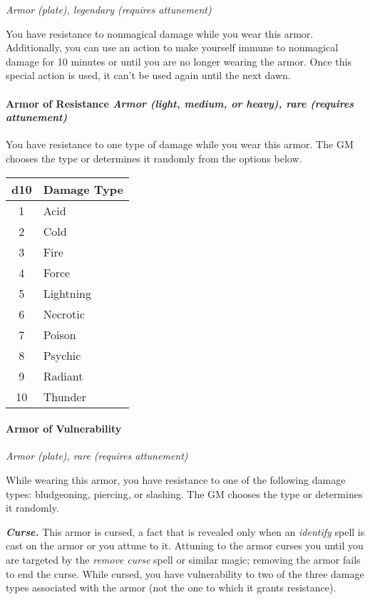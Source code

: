 \documentclass[
]{article}
\begin{document}
\emph{Armor (plate), legendary (requires attunement)}

You have resistance to nonmagical damage while you wear this armor.
Additionally, you can use an action to make yourself immune to
nonmagical damage for 10 minutes or until you are no longer wearing the
armor. Once this special action is used, it can't be used again until
the next dawn.

\hypertarget{armor-of-resistance-armor-light-medium-or-heavy-rare-requires-attunement}{%
\paragraph{\texorpdfstring{Armor of Resistance \emph{Armor (light,
medium, or heavy), rare (requires
attunement)}}{Armor of Resistance Armor (light, medium, or heavy), rare (requires attunement)}}\label{armor-of-resistance-armor-light-medium-or-heavy-rare-requires-attunement}}

You have resistance to one type of damage while you wear this armor. The
GM chooses the type or determines it randomly from the options below.

\begin{longtable}[]{@{}cl@{}}
\toprule
d10 & Damage Type\tabularnewline
\midrule
\endhead
1 & Acid\tabularnewline
2 & Cold\tabularnewline
3 & Fire\tabularnewline
4 & Force\tabularnewline
5 & Lightning\tabularnewline
6 & Necrotic\tabularnewline
7 & Poison\tabularnewline
8 & Psychic\tabularnewline
9 & Radiant\tabularnewline
10 & Thunder\tabularnewline
\bottomrule
\end{longtable}

\hypertarget{armor-of-vulnerability}{%
\paragraph{Armor of Vulnerability}\label{armor-of-vulnerability}}

\emph{Armor (plate), rare (requires attunement)}

While wearing this armor, you have resistance to one of the following
damage types: bludgeoning, piercing, or slashing. The GM chooses the
type or determines it randomly.

\emph{\textbf{Curse.}} This armor is cursed, a fact that is revealed
only when an \emph{identify} spell is cast on the armor or you attune to
it. Attuning to the armor curses you until you are targeted by the
\emph{remove curse} spell or similar magic; removing the armor fails to
end the curse. While cursed, you have vulnerability to two of the three
damage types associated with the armor (not the one to which it grants
resistance).
\end{document}
